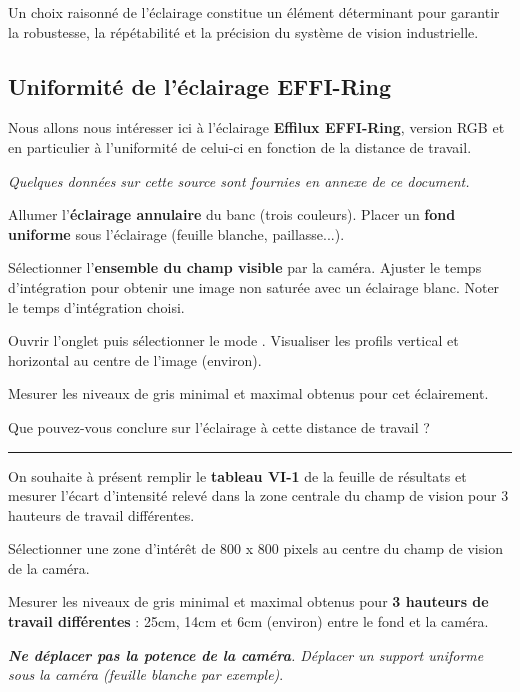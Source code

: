 Un choix raisonné de l'éclairage constitue un élément déterminant pour garantir la robustesse, la répétabilité et la précision du système de vision industrielle.

\subsection{Uniformité de l'éclairage EFFI-Ring}

Nous allons nous intéresser ici à l'éclairage \textbf{Effilux EFFI-Ring}, version RGB et en particulier à l'uniformité de celui-ci en fonction de la distance de travail.

\textit{Quelques données sur cette source sont fournies en annexe de ce document.}

\Manip Allumer l'\textbf{éclairage annulaire} du banc (trois couleurs). Placer un \textbf{fond uniforme} sous l'éclairage (feuille blanche, paillasse...).

\Manip Sélectionner l'\textbf{ensemble du champ visible} par la caméra. Ajuster le temps d'intégration pour obtenir une image non saturée avec un éclairage blanc. Noter le temps d'intégration choisi. 

\Manip Ouvrir l'onglet  puis sélectionner le mode . Visualiser les profils vertical et horizontal au centre de l'image (environ).


\Manip Mesurer les niveaux de gris minimal et maximal obtenus pour cet éclairement. 

\Quest Que pouvez-vous conclure sur l'éclairage à cette distance de travail ? 

\noindent \rule{\linewidth}{1pt}

On souhaite à présent remplir le \textbf{tableau VI-1} de la feuille de résultats et mesurer l'écart d'intensité relevé dans la zone centrale du champ de vision pour 3 hauteurs de travail différentes.

\Manip Sélectionner une zone d'intérêt de 800 x 800 pixels au centre du champ de vision de la caméra.

\Manip Mesurer les niveaux de gris minimal et maximal obtenus pour \textbf{3 hauteurs de travail différentes} : 25cm, 14cm et 6cm (environ) entre le fond et la caméra. 

\medskip

\textit{\textbf{Ne déplacer pas la potence de la caméra}. Déplacer un support uniforme sous la caméra (feuille blanche par exemple)}.

